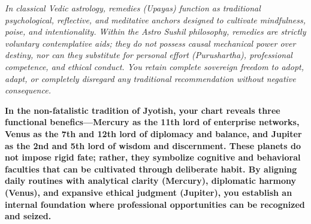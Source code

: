 


{\fontsize{9.5}{14}\selectfont\color{DeepSlate}\itshape In classical Vedic astrology, remedies (\textit{Upayas}) function as traditional psychological, reflective, and meditative anchors designed to cultivate mindfulness, poise, and intentionality. Within the Astro Sushil philosophy, remedies are strictly voluntary contemplative aids; they do not possess causal mechanical power over destiny, nor can they substitute for personal effort (\textit{Purushartha}), professional competence, and ethical conduct. You retain complete sovereign freedom to adopt, adapt, or completely disregard any traditional recommendation without negative consequence.}\par\vspace{3.5mm}

\label{topic58}

{\fontsize{9.5}{13.8}\selectfont\bfseries\color{DeepSlate} In the non-fatalistic tradition of Jyotish, your chart reveals three functional benefics---Mercury as the 11th lord of enterprise networks, Venus as the 7th and 12th lord of diplomacy and balance, and Jupiter as the 2nd and 5th lord of wisdom and discernment. These planets do not impose rigid fate; rather, they symbolize cognitive and behavioral faculties that can be cultivated through deliberate habit. By aligning daily routines with analytical clarity (Mercury), diplomatic harmony (Venus), and expansive ethical judgment (Jupiter), you establish an internal foundation where professional opportunities can be recognized and seized.}\par\vspace{2mm}


